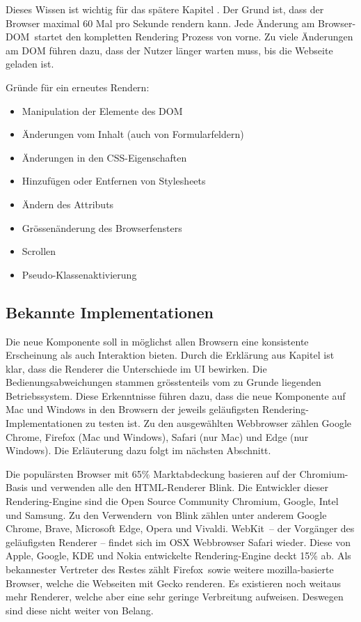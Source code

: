 Dieses Wissen ist wichtig für das spätere Kapitel \textbf{}. 
Der Grund ist, dass der Browser maximal 60 Mal pro Sekunde rendern kann.
Jede Änderung am Browser-DOM\footnotemark \ startet den kompletten Rendering Prozess von vorne.
Zu viele Änderungen am DOM führen dazu, dass der Nutzer länger warten muss, bis die Webseite geladen ist.

Gründe für ein erneutes Rendern\citemark :

\begin{itemize}
    \item Manipulation der Elemente des DOM
    \item Änderungen vom Inhalt (auch von Formularfeldern)
    \item Änderungen in den CSS-Eigenschaften
    \item Hinzufügen oder Entfernen von Stylesheets
    \item Ändern des Attributs 
    \item Grössenänderung des Browserfensters
    \item Scrollen
    \item Pseudo-Klassenaktivierung
\end{itemize}


\subsection{Bekannte Implementationen}
\label{sec:implementationsRenderer}

Die neue Komponente soll in möglichst allen Browsern eine konsistente Erscheinung als auch Interaktion bieten.
Durch die Erklärung aus Kapitel \textbf{} ist klar, dass die Renderer die Unterschiede im UI bewirken.
Die Bedienungsabweichungen stammen grösstenteils vom zu Grunde liegenden Betriebssystem.
Diese Erkenntnisse führen dazu, dass die neue Komponente auf Mac und Windows in den Browsern der jeweils geläufigsten Rendering-Implementationen zu testen ist.
Zu den ausgewählten Webbrowser zählen Google Chrome, Firefox (Mac und Windows), Safari (nur Mac) und Edge (nur Windows).
Die Erläuterung dazu folgt im nächsten Abschnitt.

Die populärsten Browser mit 65\% Marktabdeckung basieren auf der Chromium-Basis und verwenden alle den HTML-Renderer Blink\citemark.
Die Entwickler dieser Rendering-Engine sind die Open Source Community Chromium, Google, Intel und Samsung.
Zu den Verwendern\citemark \ von Blink zählen unter anderem Google Chrome, Brave, Microsoft Edge, Opera und Vivaldi.
WebKit\citemark \ – der Vorgänger des geläufigsten Renderer – findet sich im OSX Webbrowser Safari wieder.
Diese von Apple, Google, KDE und Nokia entwickelte Rendering-Engine deckt 15\% ab.
Als bekannester Vertreter des Restes zählt Firefox\citemark \ sowie weitere mozilla-basierte Browser, welche die Webseiten mit Gecko renderen.
Es existieren noch weitaus mehr Renderer, welche aber eine sehr geringe Verbreitung aufweisen.
Deswegen sind diese nicht weiter von Belang.
